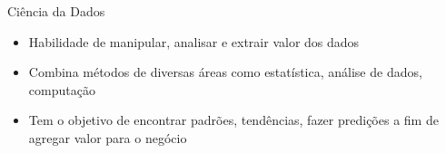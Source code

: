 
\begin{frame}[t, fragile]{Ciência da Dados}
  \begin{itemize}
    \item Habilidade de manipular, analisar e extrair valor dos dados
    \item Combina métodos de diversas áreas como estatística, análise de dados, computação
    \item Tem o objetivo de encontrar padrões, tendências, fazer predições a fim de agregar valor para o negócio
  \end{itemize}
\end{frame}

 